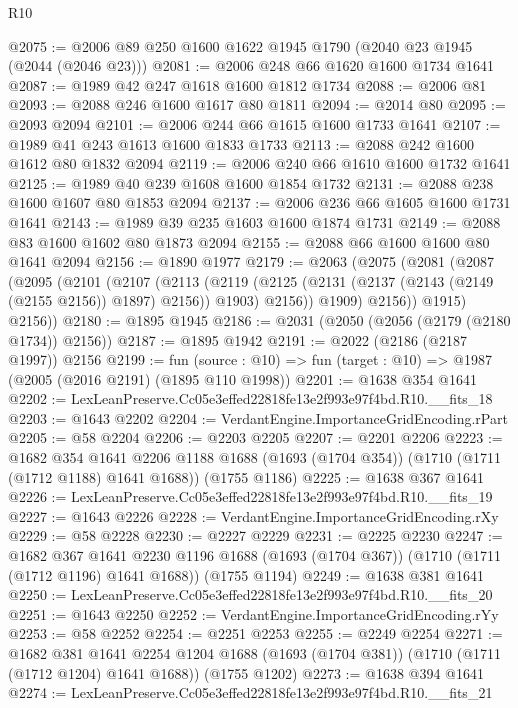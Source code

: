 \begin{lexlean}{R10}
\begin{coremodule}
@2075 := @2006 @89 @250 @1600 @1622 @1945 @1790 (@2040 @23 @1945 (@2044 (@2046 @23)))
@2081 := @2006 @248 @66 @1620 @1600 @1734 @1641
@2087 := @1989 @42 @247 @1618 @1600 @1812 @1734
@2088 := @2006 @81
@2093 := @2088 @246 @1600 @1617 @80 @1811
@2094 := @2014 @80
@2095 := @2093 @2094
@2101 := @2006 @244 @66 @1615 @1600 @1733 @1641
@2107 := @1989 @41 @243 @1613 @1600 @1833 @1733
@2113 := @2088 @242 @1600 @1612 @80 @1832 @2094
@2119 := @2006 @240 @66 @1610 @1600 @1732 @1641
@2125 := @1989 @40 @239 @1608 @1600 @1854 @1732
@2131 := @2088 @238 @1600 @1607 @80 @1853 @2094
@2137 := @2006 @236 @66 @1605 @1600 @1731 @1641
@2143 := @1989 @39 @235 @1603 @1600 @1874 @1731
@2149 := @2088 @83 @1600 @1602 @80 @1873 @2094
@2155 := @2088 @66 @1600 @1600 @80 @1641 @2094
@2156 := @1890 @1977
@2179 := @2063
    (@2075
      (@2081
        (@2087
          (@2095
            (@2101
              (@2107
                (@2113
                  (@2119
                    (@2125 (@2131 (@2137 (@2143 (@2149 (@2155 @2156)) @1897) @2156)) @1903)
                    @2156))
                @1909)
              @2156))
          @1915)
        @2156))
@2180 := @1895 @1945
@2186 := @2031 (@2050 (@2056 (@2179 (@2180 @1734)) @2156))
@2187 := @1895 @1942
@2191 := @2022 (@2186 (@2187 @1997)) @2156
@2199 := fun (source : @10) => fun (target : @10) => @1987 (@2005 (@2016 @2191) (@1895 @110 @1998))
@2201 := @1638 @354 @1641
@2202 := LexLeanPreserve.Cc05e3effed22818fe13e2f993e97f4bd.R10.__fits_18
@2203 := @1643 @2202
@2204 := VerdantEngine.ImportanceGridEncoding.rPart
@2205 := @58 @2204
@2206 := @2203 @2205
@2207 := @2201 @2206
@2223 := @1682
    @354
    @1641
    @2206
    @1188
    @1688
    (@1693 (@1704 @354))
    (@1710 (@1711 (@1712 @1188) @1641 @1688))
    (@1755 @1186)
@2225 := @1638 @367 @1641
@2226 := LexLeanPreserve.Cc05e3effed22818fe13e2f993e97f4bd.R10.__fits_19
@2227 := @1643 @2226
@2228 := VerdantEngine.ImportanceGridEncoding.rXy
@2229 := @58 @2228
@2230 := @2227 @2229
@2231 := @2225 @2230
@2247 := @1682
    @367
    @1641
    @2230
    @1196
    @1688
    (@1693 (@1704 @367))
    (@1710 (@1711 (@1712 @1196) @1641 @1688))
    (@1755 @1194)
@2249 := @1638 @381 @1641
@2250 := LexLeanPreserve.Cc05e3effed22818fe13e2f993e97f4bd.R10.__fits_20
@2251 := @1643 @2250
@2252 := VerdantEngine.ImportanceGridEncoding.rYy
@2253 := @58 @2252
@2254 := @2251 @2253
@2255 := @2249 @2254
@2271 := @1682
    @381
    @1641
    @2254
    @1204
    @1688
    (@1693 (@1704 @381))
    (@1710 (@1711 (@1712 @1204) @1641 @1688))
    (@1755 @1202)
@2273 := @1638 @394 @1641
@2274 := LexLeanPreserve.Cc05e3effed22818fe13e2f993e97f4bd.R10.__fits_21

\end{coremodule}
\end{lexlean}
